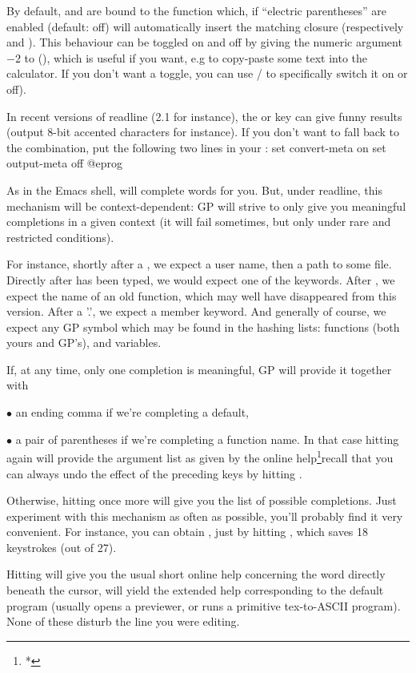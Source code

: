  By default, \kbd{(} and \kbd{[} are bound to the function
 which, if ``electric parentheses'' are enabled
(default: off) will automatically insert the matching closure (respectively
\kbd{)} and \kbd{]}). This behaviour can be toggled on and off by giving
the numeric argument $-2$ to \kbd{(} (), which is useful if you
want, e.g to copy-paste some text into the calculator. If you don't want a
toggle, you can use  /  to specifically switch it on or
off).

 In recent versions of readline (2.1 for instance), the
 or  key can give funny results (output 8-bit accented
characters for instance). If you don't want to fall back to the 
combination, put the following two lines in your :
%
\bprog
  set convert-meta on
  set output-meta off
@eprog


  As in the Emacs shell,  will complete words for you. But, under
readline, this mechanism will be context-dependent: GP will strive to only
give you meaningful completions in a given context (it will fail sometimes,
but only under rare and restricted conditions).

  For instance, shortly after a \kbd{\til}, we expect a user name, then a
path to some file. Directly after  has been typed, we would
expect one of the  keywords. After  , we expect
the name of an old function, which may well have disappeared from this
version. After a '.', we expect a member keyword. And generally of course, we
expect any GP symbol which may be found in the hashing lists: functions (both
yours and GP's), and variables.

  If, at any time, only one completion is meaningful, GP will provide it
together with

$\bullet$ an ending comma if we're completing a default,

$\bullet$ a pair of parentheses if we're completing a function name. In
that case hitting  again will provide the argument list as given
by the online help\footnote{*}{recall that you can always undo the effect
of the preceding keys by hitting }.

Otherwise, hitting  once more will give you the list of possible
completions. Just experiment with this mechanism as often as possible,
you'll probably find it very convenient. For instance, you can obtain
, just by hitting ,
which saves 18 keystrokes (out of 27).

  Hitting  will give you the usual short online help concerning the
word directly beneath the cursor,  will yield the extended help
corresponding to the  default program (usually opens a 
previewer, or runs a primitive tex-to-ASCII program). None of these disturb
the line you were editing.
\vfill\eject
